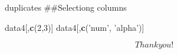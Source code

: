 \documentclass[ignorenonframetext,]{beamer}
\newenvironment{Shaded}{\begin{snugshade}}{\end{snugshade}}
\newcommand{\DecValTok}[1]{\textcolor[rgb]{0.00,0.00,0.81}{#1}}
\newcommand{\KeywordTok}[1]{\textcolor[rgb]{0.13,0.29,0.53}{\textbf{#1}}}
\newcommand{\NormalTok}[1]{#1}
\newcommand{\StringTok}[1]{\textcolor[rgb]{0.31,0.60,0.02}{#1}}
\begin{document}
\begin{frame}[fragile]{duplicates}
\#\#Selectiong columns

\begin{Shaded}
\begin{Highlighting}[]
\NormalTok{data4[,}\KeywordTok{c}\NormalTok{(}\DecValTok{2}\NormalTok{,}\DecValTok{3}\NormalTok{)]}
\NormalTok{data4[,}\KeywordTok{c}\NormalTok{(}\StringTok{'num'}\NormalTok{, }\StringTok{'alpha'}\NormalTok{)]}
\end{Highlighting}
\end{Shaded}

\end{frame}

\begin{frame}

\[Thank you!\]

\end{frame}
\end{document}
